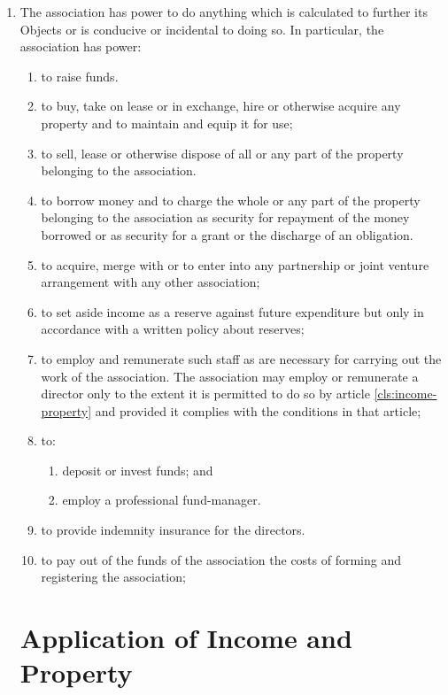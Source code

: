 \begin{enumerate}
\item
  The association has power to do anything which is calculated to further
  its Objects or is conducive or incidental to doing so. In
  particular, the association has power:
  \begin{enumerate}
  \item
    to raise funds. 
  \item
    to buy, take on lease or in exchange, hire or otherwise acquire any
    property and to maintain and equip it for use;
  \item
    to sell, lease or otherwise dispose of all or any part of the
    property belonging to the association.  
  \item
    to borrow money and to charge the whole or any part of the property
    belonging to the association as security for repayment of the money
    borrowed or as security for a grant or the discharge of an
    obligation.
  \item
    to acquire, merge with or to enter into any partnership or joint
    venture arrangement with any other association;
  \item
    to set aside income as a reserve against future expenditure but
    only in accordance with a written policy about reserves;
  \item
    to employ and remunerate such staff as are necessary for carrying
    out the work of the association. The association may employ or remunerate a
    director only to the extent it is permitted to do so by article \ref{cls:income-property}
    and provided it complies with the conditions in that article;
  \item
    to:
    \begin{enumerate}
    \item
      deposit or invest funds; and
    \item
      employ a professional fund-manager.
    \end{enumerate}
  \item
    to provide indemnity insurance for the directors.
  \item
    to pay out of the funds of the association the costs of forming and
    registering the association;
  \end{enumerate}

\section{Application of Income and Property}


\end{enumerate}
